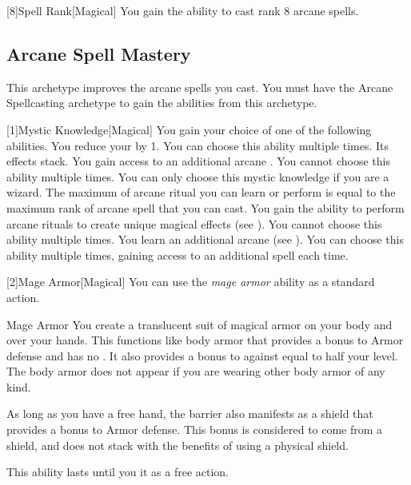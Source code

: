         [8]{Spell Rank}[Magical] You gain the ability to cast rank 8 arcane spells.

    \subsection{Arcane Spell Mastery}
        This archetype improves the arcane spells you cast.
        You must have the Arcane Spellcasting archetype to gain the abilities from this archetype.

        [1]{Mystic Knowledge}[Magical]
        You gain your choice of one of the following abilities.
        {
             You reduce your  by 1.
                You can choose this ability multiple times.
                Its effects stack.
             You gain access to an additional arcane .
                You cannot choose this ability multiple times.
             You can only choose this mystic knowledge if you are a wizard.
                The maximum  of arcane ritual you can learn or perform is equal to the maximum rank of arcane spell that you can cast.
                You gain the ability to perform arcane rituals to create unique magical effects (see ).
                You cannot choose this ability multiple times.
             You learn an additional arcane  (see ).
                You can choose this ability multiple times, gaining access to an additional spell each time.
        }

        [2]{Mage Armor}[Magical] You can use the \textit{mage armor} ability as a standard action.
        \begin{freeability}{Mage Armor}
            You create a translucent suit of magical armor on your body and over your hands.
            This functions like body armor that provides a  bonus to Armor defense and has no .
            It also provides a bonus to  against  equal to half your level.
            The body armor does not appear if you are wearing other body armor of any kind.

            As long as you have a free hand, the barrier also manifests as a shield that provides a  bonus to Armor defense.
            This bonus is considered to come from a shield, and does not stack with the benefits of using a physical shield.

            This ability lasts until you  it as a free action.
        \end{freeability}

